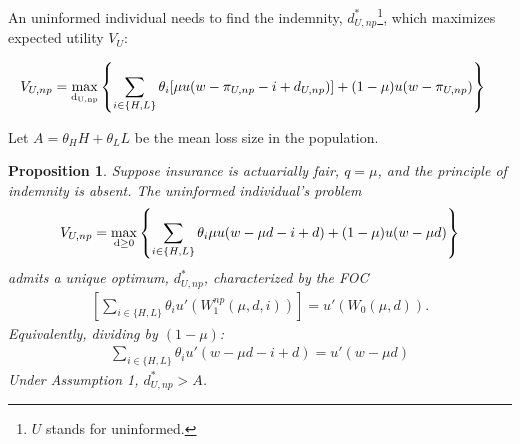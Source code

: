 \documentclass[natbib=false,preprint,12pt]{elsarticle}
\theoremstyle{plain}
\newtheorem{prop}[theorem]{Proposition}
\theoremstyle{definition}
\theoremstyle{plain}
\theoremstyle{TheoremNum}
\theoremstyle{CorollaryNum}
\theoremstyle{PropositionNum}
\theoremstyle{TheoremNum}
\begin{document}
An uninformed individual needs to find the indemnity, $d_{U,np}^*$\footnote{$U$ stands for uninformed.}, which maximizes expected utility $V_U$:

\begin{align}
    V_{U,np} & = \underset{\rm d_{U,np}}{\rm max } \left\{\sum_{i \in \{H,L\}} \theta_i[\mu u(w-\pi_{U,np}-i+d_{U,np})] +(1-\mu)u(w-\pi_{U,np}) \right\}
\label{uninformed_np_maxproblem}
\end{align}

Let $A=\theta_H H + \theta_L L$ be the mean loss size in the population. 


\setcounter{theorem}{0}
\renewcommand{\thetheorem}{\arabic{theorem}}

\begin{prop}\label{prop:duninfnp}
    Suppose insurance is actuarially fair, $q=\mu$, and the principle of indemnity is absent. The uninformed individual's problem
    \begin{align}
        V_{U,np} = \underset{\rm d\geq0}{\rm max} \left\{\sum_{i\in\{H,L\}} \theta_i\mu u(w-\mu d - i + d)+(1-\mu)u(w-\mu d)\right\}
    \end{align}
    admits a unique optimum, $d_{U,np}^*$, characterized by the FOC
    \begin{align}\label{prop:prop1foc}
        \left[\sum_{i\in\{H,L\}} \theta_i u'(W_1^{np}(\mu,d,i))\right] = u'(W_0(\mu,d)).
    \end{align}
    Equivalently, dividing by $(1-\mu)$:
    \begin{align}
        \sum_{i\in\{H,L\}} \theta_i u'(w-\mu d-i+d) = u'(w-\mu d)
    \end{align}
    Under Assumption 1, $d_{U,np}^*>A$.
\end{prop}
\end{document}
